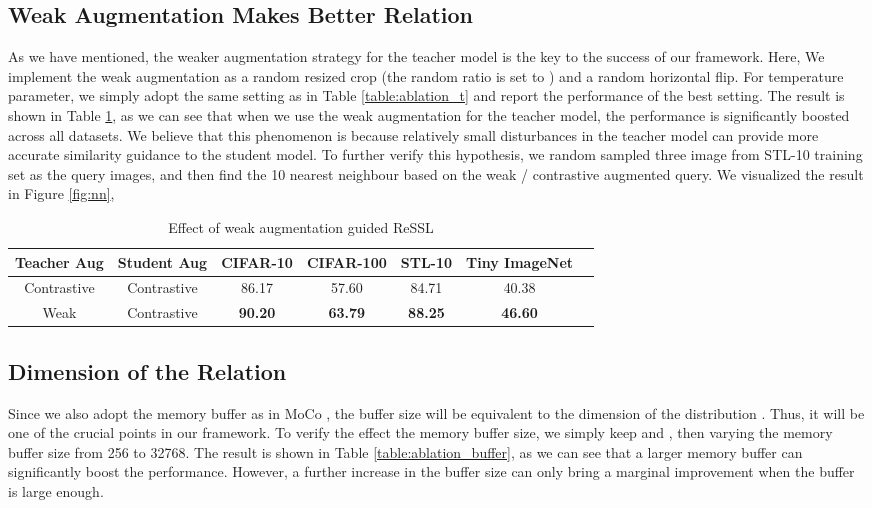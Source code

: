 \documentclass{article}
\newcommand{\<}{\left\langle}
\renewcommand{\>}{\right\rangle}
\begin{document}
\subsection{Weak Augmentation Makes Better Relation}
As we have mentioned, the weaker augmentation strategy for the teacher model is the key to the success of our framework. Here, We implement the weak augmentation as a random resized crop (the random ratio is set to ) and a random horizontal flip.  For temperature parameter, we simply adopt the same setting as in Table \ref{table:ablation_t} and report the performance of the best setting. The result is shown in Table \ref{table:ablation_weakaug}, as we can see that when we use the weak augmentation for the teacher model, the performance is significantly boosted across all datasets. We believe that this phenomenon is because relatively small disturbances in the teacher model can provide more accurate similarity guidance to the student model. To further verify this hypothesis, we random sampled three image from STL-10 training set as the query images, and then find the 10 nearest neighbour based on the weak / contrastive augmented query. We visualized the result in Figure \ref{fig:nn}, 

\renewcommand\arraystretch{1.15}
\begin{table}[h]
 \centering
 \setlength\tabcolsep{5pt}
 \small
 \vspace{-5pt}
 \caption{Effect of weak augmentation guided ReSSL }
 \vspace{-5pt}
 \label{table:ablation_weakaug}
\begin{tabular}{c c c c c c c } 
\toprule 
Teacher Aug & Student Aug & CIFAR-10 & CIFAR-100 & STL-10 & Tiny ImageNet \\ \hline
Contrastive & Contrastive  & 86.17 & 57.60 & 84.71 & 40.38 \\
Weak   & Contrastive  & \textbf{90.20} & \textbf{63.79} & \textbf{88.25} & \textbf{46.60}   \\ \hline
\toprule 
\end{tabular}
\vspace{-15pt}
\end{table}


\subsection{Dimension of the Relation}
Since we also adopt the memory buffer as in MoCo \cite{moco}, the buffer size will be equivalent to the dimension of the distribution  . Thus, it will be one of the crucial points in our framework. To verify the effect the memory buffer size, we simply keep  and , then varying the memory buffer size from 256 to 32768. The result is shown in Table \ref{table:ablation_buffer}, as we can see that a larger memory buffer can significantly boost the performance. However, a further increase in the buffer size can only bring a marginal improvement when the buffer is large enough.
\end{document}
